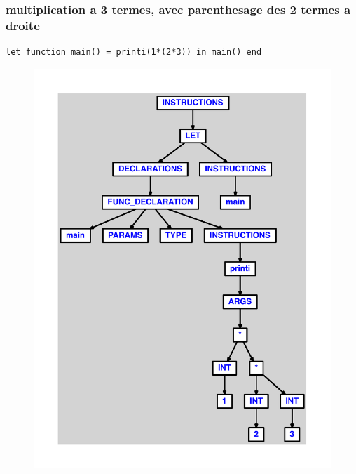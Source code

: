 \documentclass{article}
\begin{document}
\subsubsection{multiplication a 3 termes, avec parenthesage des 2 termes a droite}
\begin{lstlisting}
let function main() = printi(1*(2*3)) in main() end
\end{lstlisting}
\newpage
\begin{figure}[H]
\centering
\includegraphics[max width=\textwidth]{ast/ast_93.pdf}
\end{figure}
\newpage
\end{document}
